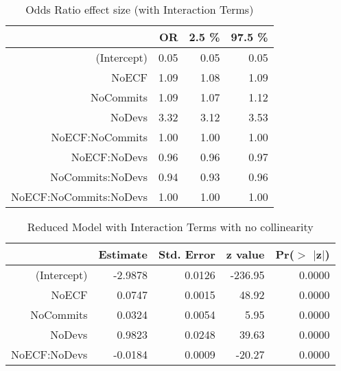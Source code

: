 \documentclass[times]{smrauth}
\begin{document}
\begin{table}[tbp]
\centering
\caption{Odds Ratio effect size (with Interaction Terms)} 
\label{tab:collinearityvif}
\begin{tabular}{rrrr}
  \hline
 & OR & 2.5 \% & 97.5 \% \\ 
  \hline
(Intercept) & 0.05 & 0.05 & 0.05 \\ 
  NoECF & 1.09 & 1.08 & 1.09 \\ 
  NoCommits & 1.09 & 1.07 & 1.12 \\ 
  NoDevs & 3.32 & 3.12 & 3.53 \\ 
  NoECF:NoCommits & 1.00 & 1.00 & 1.00 \\ 
  NoECF:NoDevs & 0.96 & 0.96 & 0.97 \\ 
  NoCommits:NoDevs & 0.94 & 0.93 & 0.96 \\ 
  NoECF:NoCommits:NoDevs & 1.00 & 1.00 & 1.00 \\ 
   \hline
\end{tabular}
\end{table}






\begin{table}[tbp]
\centering
\caption{Reduced Model with Interaction Terms with no collinearity} 
\label{tBest}
\begin{tabular}{rrrrr}
  \hline
 & Estimate & Std. Error & z value & Pr($>$ $|$z$|$) \\ 
  \hline
(Intercept) & -2.9878 & 0.0126 & -236.95 & 0.0000 \\ 
  NoECF & 0.0747 & 0.0015 & 48.92 & 0.0000 \\ 
  NoCommits & 0.0324 & 0.0054 & 5.95 & 0.0000 \\ 
  NoDevs & 0.9823 & 0.0248 & 39.63 & 0.0000 \\ 
  NoECF:NoDevs & -0.0184 & 0.0009 & -20.27 & 0.0000 \\ 
   \hline
\end{tabular}
\end{table}%
\end{document}
